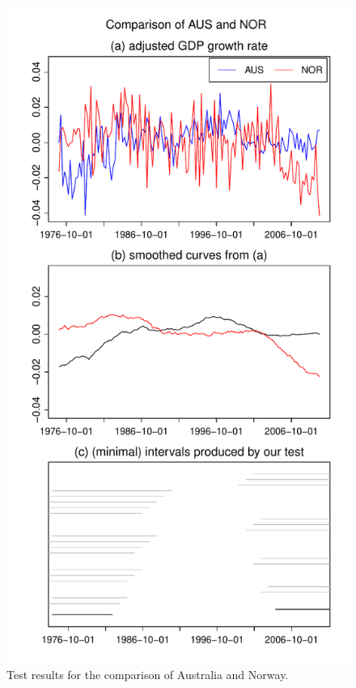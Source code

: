 \documentclass[a4paper,12pt]{article}
\begin{document}
\begin{figure}[b!]
\begin{minipage}[t]{0.49\textwidth}
\includegraphics[width=\textwidth]{Plots/gdp/AUS_vs_NOR}
\caption{Test results for the comparison of Australia and Norway.}\label{fig:Australia:Norway}
\end{minipage}
\hspace{0.25cm}

\end{figure}
\end{document}
